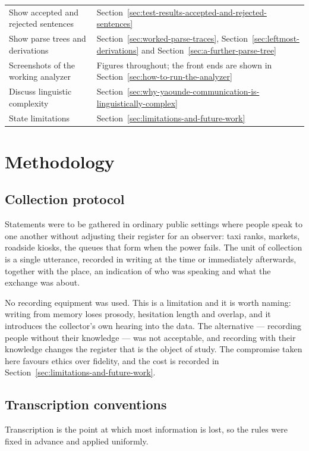 \documentclass[11pt,a4paper]{article}
\begin{document}
\begin{longtable}{L{0.40} L{0.42}}
Show accepted and rejected sentences & Section~\ref{sec:test-results-accepted-and-rejected-sentences} \\
Show parse trees and derivations & Section~\ref{sec:worked-parse-traces}, Section~\ref{sec:leftmost-derivations} and Section~\ref{sec:a-further-parse-tree} \\
Screenshots of the working analyzer & Figures throughout; the front ends are shown in Section~\ref{sec:how-to-run-the-analyzer} \\
Discuss linguistic complexity & Section~\ref{sec:why-yaounde-communication-is-linguistically-complex} \\
State limitations & Section~\ref{sec:limitations-and-future-work} \\
\end{longtable}
\endgroup

\section{Methodology}
\label{sec:methodology}
\subsection{Collection protocol}
Statements were to be gathered in ordinary public settings where people speak to one another without adjusting their register for an observer: taxi ranks, markets, roadside kiosks, the queues that form when the power fails. The unit of collection is a single utterance, recorded in writing at the time or immediately afterwards, together with the place, an indication of who was speaking and what the exchange was about.

No recording equipment was used. This is a limitation and it is worth naming: writing from memory loses prosody, hesitation length and overlap, and it introduces the collector's own hearing into the data. The alternative --- recording people without their knowledge --- was not acceptable, and recording with their knowledge changes the register that is the object of study. The compromise taken here favours ethics over fidelity, and the cost is recorded in Section~\ref{sec:limitations-and-future-work}.

\subsection{Transcription conventions}
Transcription is the point at which most information is lost, so the rules were fixed in advance and applied uniformly.
\end{document}
